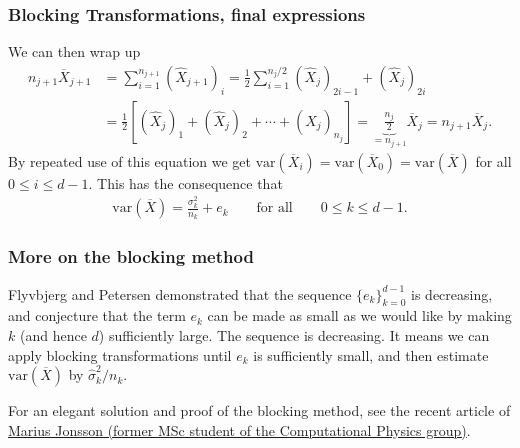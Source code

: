 \documentclass{beamer}
\begin{document}
\begin{frame}
\frametitle{Blocking Transformations, final expressions}

We can then wrap up
\begin{align}
n_{j+1} \overline{X}_{j+1}  &= \sum_{i=1}^{n_{j+1}} (\hat{X}_{j+1})_i =  \frac{1}{2}\sum_{i=1}^{n_{j}/2} (\hat{X}_{j})_{2i-1} + (\hat{X}_{j})_{2i} \nonumber \\
&= \frac{1}{2}\left[ (\hat{X}_j)_1 + (\hat{X}_j)_2 + \cdots + (\hat{X}_j)_{n_j} \right] = \underbrace{\frac{n_j}{2}}_{=n_{j+1}} \overline{X}_j = n_{j+1}\overline{X}_j. 
\end{align}
By repeated use of this equation we get $\mathrm{var}(\overline{X}_i) = \mathrm{var}(\overline{X}_0) = \mathrm{var}(\overline{X})$ for all $0 \leq i \leq d-1$. This has the consequence that
\begin{align}
\mathrm{var}(\overline{X}) = \frac{\sigma_k^2}{n_k} + e_k \qquad \text{for all} \qquad 0 \leq k \leq d-1. \label{eq:convergence}
\end{align}
\end{frame}

\begin{frame}
\frametitle{More on the blocking method}

Flyvbjerg and Petersen demonstrated that the sequence
$\{e_k\}_{k=0}^{d-1}$ is decreasing, and conjecture that the term
$e_k$ can be made as small as we would like by making $k$ (and hence
$d$) sufficiently large. The sequence is decreasing.
It means we can apply blocking transformations until
$e_k$ is sufficiently small, and then estimate $\mathrm{var}(\overline{X})$ by
$\widehat{\sigma}^2_k/n_k$. 

For an elegant solution and proof of the blocking method, see the recent article of \href{{https://journals.aps.org/pre/abstract/10.1103/PhysRevE.98.043304}}{Marius Jonsson (former MSc student of the Computational Physics group)}.
\end{frame}
\end{document}

